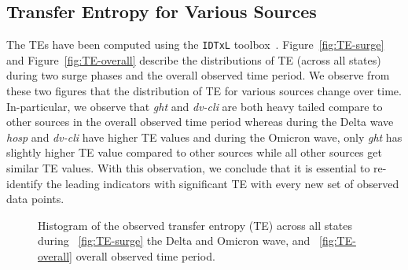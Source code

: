 \documentclass[conference,compsoc]{IEEEtran}
\begin{document}
\subsection{Transfer Entropy for Various Sources} \label{subsec:dynamic-TE-src}
The TEs have been computed using the \verb|IDTxL| toolbox~\cite{wollstadt2018idtxl}. 
Figure~\ref{fig:TE-surge} and Figure~\ref{fig:TE-overall} describe the   distributions of TE (across all states)  during two surge phases and the overall observed time period. We observe from these two figures that the distribution of TE for various sources change over time. In-particular, we observe that \emph{ght} and \emph{dv-cli} are both heavy tailed compare to other sources in the overall observed time period whereas during the Delta wave \emph{hosp} and \emph{dv-cli} have higher TE values and during the Omicron wave, only \emph{ght} has slightly higher TE value compared to other sources while all other sources get similar TE values. With this observation, we conclude that it is essential to re-identify the leading indicators with significant TE with every new set of observed data points. 

\begin{figure}[!t]
    \centering
     \hfil
     \caption{Histogram of the observed transfer entropy (TE) across all states during ~\ref{fig:TE-surge} the Delta and Omicron wave, and ~\ref{fig:TE-overall} overall observed time period.  }
 \end{figure}
\end{document}
